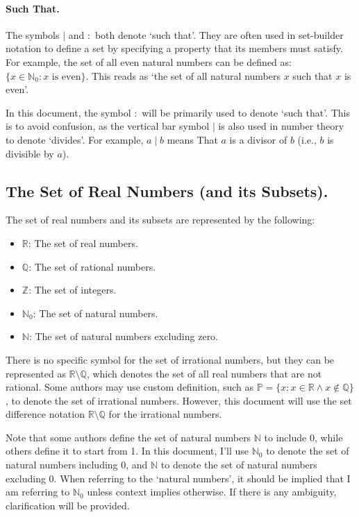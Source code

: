 \documentclass[a4paper, twoside]{article}
\newcommand{\R}{\mathbb{R}}
\newcommand{\Q}{\mathbb{Q}}
\newcommand{\Z}{\mathbb{Z}}
\newcommand{\N}{\mathbb{N}}
\begin{document}
\paragraph{Such That.}
The symbols \(\mid\) and \(:\) both denote `such that'. They are often used in set-builder notation to define a set by specifying a property that its members must satisfy. For example, the set of all even natural numbers can be defined as: \( \{ x \in \N_0 : x \text{ is even}\} \). This reads as `the set of all natural numbers \(x\) such that \(x\) is even'.

In this document, the symbol \(:\) will be primarily used to denote `such that'. This is to avoid confusion, as the vertical bar symbol \(\mid\) is also used in number theory to denote `divides'. For example, \(a \mid b\) means That \(a\) is a divisor of \(b\) (i.e., \(b\) is divisible by \(a\)).

\newpage

\subsection{The Set of Real Numbers (and its Subsets).}
The set of real numbers and its subsets are represented by the following:

\begin{itemize}
    \item \(\R\): The set of real numbers.
    \item \(\Q\): The set of rational numbers.
    \item \(\Z\): The set of integers.
    \item \(\N_0\): The set of natural numbers.
    \item \(\N\): The set of natural numbers excluding zero.
\end{itemize}

There is no specific symbol for the set of irrational numbers, but they can be represented as \(\R \setminus \Q\), which denotes the set of all real numbers that are not rational. Some authors may use custom definition, such as \(\mathbb{P} = \{ x : x \in \R \land x \notin \Q \}\), to denote the set of irrational numbers. However, this document will use the set difference notation \(\R \setminus \Q\) for the irrational numbers.

Note that some authors define the set of natural numbers \(\N\) to include 0, while others define it to start from 1. In this document, I'll use \(\N_0\) to denote the set of natural numbers including 0, and \(\N\) to denote the set of natural numbers excluding 0. When referring to the `natural numbers', it should be implied that I am referring to \(\N_0\) unless context implies otherwise. If there is any ambiguity, clarification will be provided.
\end{document}
